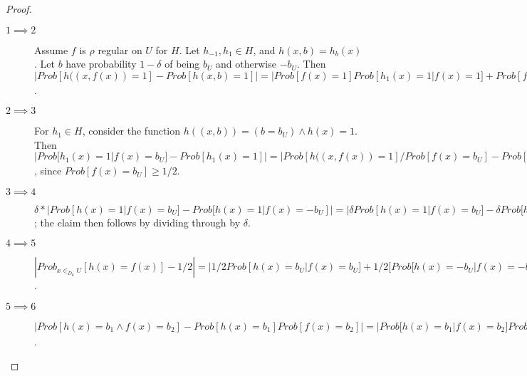 \documentclass[a4paper]{article}
\begin{document}
\begin{proof}
\begin{description}
\item[$1 \implies  2$]
Assume $f$ is $\rho$ regular on $U$ for $H$.  
Let $h_{-1}, h_1 \in H$, and $h(x,b)= h_b (x)$. Let $b$ have probability $1- \delta$ of being $b_U$
and otherwise $-b_U$. Then \( |Prob[ h((x,f(x))=1] - Prob[h(x,b)=1] |= | Prob[f(x)=1] Prob[h_{1}(x)
=1 | f(x)=1] + Prob[f(x)=-1] Prob[h_{-1}(x) = 1 | f(x) = -1] - Prob[f(x)=1] Prob[h_1(x) =1] -
Prob[f(x)=-1] Prob[h_{-1} (x)=1] | \le | Prob[f(x)=1 \land h_1 (x)=1] - Prob[f(x)=1] Prob[h_1(x)
=1]| + | Prob[f(x)=-1 \land h_{-1}(x) = 1 ] - Prob[f(x)=-1] Prob[h_{-1} (x)=1] | \le 2 \rho = \rho_1
\).

\item[$2 \implies 3$]
For $h_1 \in H$, consider the function $h ((x,b))=  (b=b_U) \land h(x)=1$. Then $|Prob [h_1(x) =1 |
f(x) = b_U] - Prob[h_1(x) =1] | =  
|Prob[h((x,f(x))=1]/Prob[f(x)=b_U] - Prob[h_1(x)=1] | = 1/Prob[f(x)=b_U] |Prob[h(x,f(x))=1] -
Prob[h(x,b)=1] \le 2 rho_1= \rho_2$, since $Prob[f(x)=b_U] \ge 1/2$.  

\item[$3 \implies 4$]
$\delta * |Prob[h(x) = 1 | f(x) = b_U] - Prob[ h(x) =1 | f(x) = - b_U] | = |\delta Prob[h(x) = 1 |
f(x) = b_U] - \delta Prob[ h(x) =1 | f(x) = - b_U] + Prob[h(x)=1]-Prob[h(x)=1] | =  
|\delta Prob[h(x) = 1 | f(x) = b_U] - \delta Prob[ h(x) =1 | f(x) = - b_U] + (1-\delta) Prob[h(x)=1
| f(x)=b_U] + \delta Prob[h(x)=1 | f(x)=-b_U] ] -Prob[h(x)=1] | =  |Prob[h(x)=1 | f(x)=b_U ]
-Prob[h(x)=1]  \le rho_2$; the claim then follows by dividing through by $\delta$.  

\item[$4 \implies 5$]
$|Prob_{x \in_{D_\mu} U} [h(x)=f(x)] -1/2 | = |1/2 Prob[h(x)= b_U | f(x)=b_U] +1/2 [Prob[h(x)=-b_U |
f(x) = -b_U] -1/2 = | 1/2 Prob[h(x)=b_U | f(x)= b_U] +1/2 (1 - Prob[h(x)=b_U | f(x) = -b_U]) -1/2| =
1/2 (Prob[h(x)=b_U | f(x)= b_U]- Prob[h(x)=b_U | f(x)= -b_U]) \le 1/2 \rho_3/\delta$.
\item[$5 \implies 6$]
$|Prob[ h(x)=b_1 \land f(x)=b_2] - Prob[ h(x) =b_1] Prob[f(x)=b_2] | = |Prob [h(x)= b_1
|f(x)=b_2]Prob[f(x)=b_2]  - Prob[h(x)=b_1 ] Prob[f(x)=b_2]|= Prob[f(x)=b_2]  |Prob[h(x)=b_1 |
f(x)=b_2] - Prob[h(x)= b_1]| = Prob[f(x)=b_2] |Prob[h(x)=b_1 | f(x) =b_2] - (Prob[f(x)=b_2])
Prob[h(x)=b_1 | f(x) =b_2] + (1-Prob[f(x) = b_2]) Prob[h(x)=b_1 | f(x) = -b_2]| = Prob[f(x)=b_2] (1
- Prob[f(x)=b_2) | Prob[h(x)=b_1 | f(x)=b_2 ] - Prob[h(x)=b_1|f(x)= -b_2] \le \delta (1 - \delta)
(\rho_4/\delta) < \rho_4 $.
\end{description}
\end{proof}
\end{document}
